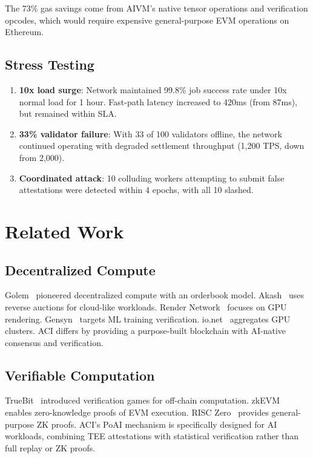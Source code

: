 \documentclass[11pt,twocolumn]{article}
\begin{document}
The 73\% gas savings come from AIVM's native tensor operations and verification opcodes, which would require expensive general-purpose EVM operations on Ethereum.

\subsection{Stress Testing}

\begin{enumerate}[leftmargin=1.4em]
    \item \textbf{10x load surge}: Network maintained 99.8\% job success rate under 10x normal load for 1 hour. Fast-path latency increased to 420ms (from 87ms), but remained within SLA.
    \item \textbf{33\% validator failure}: With 33 of 100 validators offline, the network continued operating with degraded settlement throughput (1,200 TPS, down from 2,000).
    \item \textbf{Coordinated attack}: 10 colluding workers attempting to submit false attestations were detected within 4 epochs, with all 10 slashed.
\end{enumerate}

\section{Related Work}
\label{sec:related}

\subsection{Decentralized Compute}

Golem~\cite{golem2016} pioneered decentralized compute with an orderbook model. Akash~\cite{akash2020} uses reverse auctions for cloud-like workloads. Render Network~\cite{rendernetwork2021} focuses on GPU rendering. Gensyn~\cite{gensyn2023} targets ML training verification. io.net~\cite{ionet2024} aggregates GPU clusters. ACI differs by providing a purpose-built blockchain with AI-native consensus and verification.

\subsection{Verifiable Computation}

TrueBit~\cite{teutsch2019truebit} introduced verification games for off-chain computation. zkEVM~\cite{zkevm2023} enables zero-knowledge proofs of EVM execution. RISC Zero~\cite{risczero2023} provides general-purpose ZK proofs. ACI's PoAI mechanism is specifically designed for AI workloads, combining TEE attestations with statistical verification rather than full replay or ZK proofs.
\end{document}
